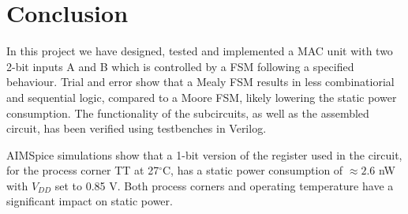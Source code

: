 \section{Conclusion}
\label{sec:conclution}

In this project we have designed, tested and implemented a MAC unit with two 2-bit inputs A and B which is controlled by a FSM following a specified behaviour. Trial and error show that a Mealy FSM results in less combinatiorial and sequential logic, compared to a Moore FSM, likely lowering the static power consumption. The functionality of the subcircuits, as well as the assembled circuit, has been verified using testbenches in Verilog. 

AIMSpice simulations show that a 1-bit version of the register used in the circuit, for the process corner TT at 27$^\circ$C, has a static power consumption of $\approx2.6$ nW with $V_{DD}$ set to 0.85 V. Both process corners and operating temperature have a significant impact on static power.

 
